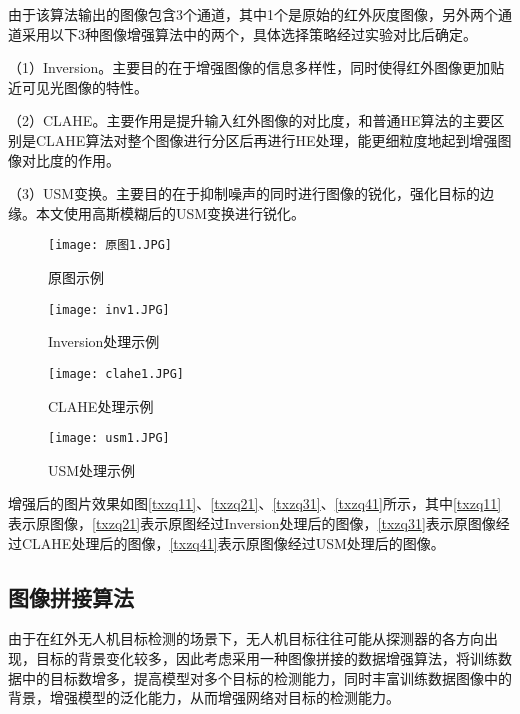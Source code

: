 由于该算法输出的图像包含3个通道，其中1个是原始的红外灰度图像，另外两个通道采用以下3种图像增强算法中的两个，具体选择策略经过实验对比后确定。

（1）Inversion。主要目的在于增强图像的信息多样性，同时使得红外图像更加贴近可见光图像的特性。

（2）CLAHE。主要作用是提升输入红外图像的对比度，和普通HE算法的主要区别是CLAHE算法对整个图像进行分区后再进行HE处理，能更细粒度地起到增强图像对比度的作用。

（3）USM变换。主要目的在于抑制噪声的同时进行图像的锐化，强化目标的边缘。本文使用高斯模糊后的USM变换进行锐化。

\begin{figure}[htbp]
	\centering
	\begin{minipage}{0.49\linewidth}
		\centering
		\texttt{[image: 原图1.JPG]}
		\caption{原图示例}
		\label{txzq11}%
	\end{minipage}
	\begin{minipage}{0.49\linewidth}
		\centering
		\texttt{[image: inv1.JPG]}
		\caption{Inversion处理示例}
		\label{txzq21}%
	\end{minipage}
	
	\begin{minipage}{0.49\linewidth}
		\centering
		\texttt{[image: clahe1.JPG]}
		\caption{CLAHE处理示例}
		\label{txzq31}%
	\end{minipage}
	\begin{minipage}{0.49\linewidth}
		\centering
		\texttt{[image: usm1.JPG]}
		\caption{USM处理示例}
		\label{txzq41}%
	\end{minipage}
  \label{txzq}
\end{figure}

增强后的图片效果如图\ref{txzq11}、\ref{txzq21}、\ref{txzq31}、\ref{txzq41}所示，其中\ref{txzq11}表示原图像，\ref{txzq21}表示原图经过Inversion处理后的图像，\ref{txzq31}表示原图像经过CLAHE处理后的图像，\ref{txzq41}表示原图像经过USM处理后的图像。

\subsection{图像拼接算法}
由于在红外无人机目标检测的场景下，无人机目标往往可能从探测器的各方向出现，目标的背景变化较多，因此考虑采用一种图像拼接的数据增强算法，将训练数据中的目标数增多，提高模型对多个目标的检测能力，同时丰富训练数据图像中的背景，增强模型的泛化能力，从而增强网络对目标的检测能力。

